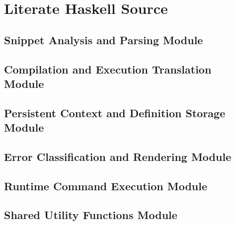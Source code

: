 \documentclass[11pt]{scrartcl}
\begin{document}
\clearpage
\section{Literate Haskell Source}

\subsection{Snippet Analysis and Parsing Module}

\subsection{Compilation and Execution Translation Module}

\subsection{Persistent Context and Definition Storage Module}

\subsection{Error Classification and Rendering Module}

\subsection{Runtime Command Execution Module}

\subsection{Shared Utility Functions Module}

\end{document}
